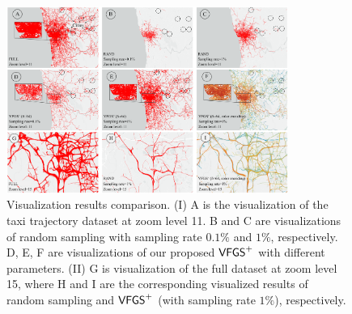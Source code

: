 
\begin{figure}[t]
	\centering
	\includegraphics[width=0.82\textwidth]{pictures/Teaser.pdf}
	\vspace{-3mm}
	\caption{Visualization results comparison. (I) A is the visualization of the \pt{} taxi trajectory dataset at zoom level 11.
    B and C are visualizations of random sampling with sampling rate $0.1\%$ and $1\%$, respectively.
    D, E, F are visualizations of our proposed $\mathsf{VFGS}^{+}$ with different parameters.
    (II) G is visualization of the full \pt{} dataset at zoom level 15, where H and I are the corresponding visualized results of random sampling and $\mathsf{VFGS}^{+}$ (with sampling rate $1\%$), respectively.}
	\label{fig:teaser}
\trim 
\end{figure}

